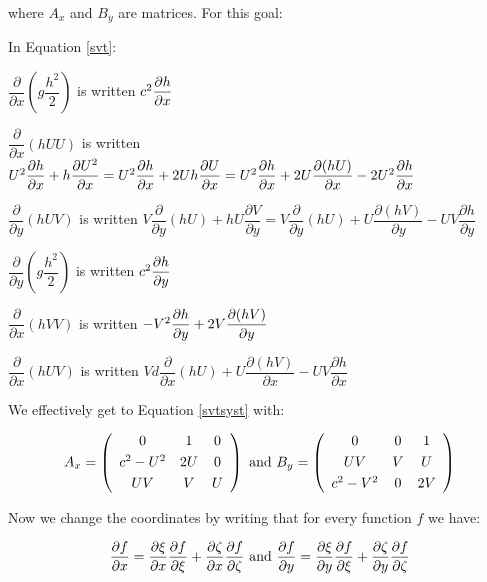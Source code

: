 where $A_{x}$ and $B_{y}$ are matrices. For this goal:

In Equation \ref{svt}:

$\dfrac{\partial }{\partial x}(g\dfrac{h^{2}}{2})$ is written $c^{2}\dfrac{%
\partial h}{\partial x}$

$\dfrac{\partial }{\partial x}(hUU)$ is written $U^{2}\dfrac{\partial h}{%
\partial x}+h\dfrac{\partial U^{2}}{\partial x}=U^{2}\dfrac{\partial h}{%
\partial x}+2Uh\dfrac{\partial U}{\partial x}=U^{2}\dfrac{\partial h}{\partial
x}+2U\dfrac{\partial (hU)}{\partial x}-2U^{2}\dfrac{\partial h}{\partial x}$

$\dfrac{\partial }{\partial y}(hUV)$ is written $V\dfrac{\partial }{\partial y}%
(hU)+hU\dfrac{\partial V}{\partial y}=V\dfrac{\partial }{\partial y}(hU)+U%
\dfrac{\partial (hV)}{\partial y}-UV\dfrac{\partial h}{\partial y}$

$\dfrac{\partial }{\partial y}(g\dfrac{h^{2}}{2})$ is written $c^{2}\dfrac{%
\partial h}{\partial y}$

$\dfrac{\partial }{\partial x}(hVV)$ is written $-V^{2}\dfrac{\partial h}{%
\partial y}+2V\dfrac{\partial (hV)}{\partial y}$

$\dfrac{\partial }{\partial x}(hUV)$ is written $Vd\dfrac{\partial }{\partial x}%
(hU)+U\dfrac{\partial (hV)}{\partial x}-UV\dfrac{\partial h}{\partial x}$

We effectively get to Equation \ref{svtsyst} with:

\begin{equation}
A_{x}=\left( 
\begin{array}{ccc}
0 & 1 & 0 \smallskip\\ 
c^{2}-U^{2} & 2U & 0 \smallskip\\ 
UV & V & U%
\end{array}
\right) \text{ and }B_{y}=\left( 
\begin{array}{ccc}
0 & 0 & 1 \smallskip\\ 
UV & V & U \smallskip\\ 
c^{2}-V^{2} & 0 & 2V%
\end{array}
\right)
\end{equation}

Now we change the coordinates by writing that for every function $f$ we have:

\begin{equation*}
\dfrac{\partial f}{\partial x}=\dfrac{\partial \xi }{\partial x}\dfrac{%
\partial f}{\partial \xi }+\dfrac{\partial \zeta }{\partial x}\dfrac{\partial
f}{\partial \zeta }\text{ and }\dfrac{\partial f}{\partial y}=\dfrac{\partial
\xi }{\partial y}\dfrac{\partial f}{\partial \xi }+\dfrac{\partial \zeta }{%
\partial y}\dfrac{\partial f}{\partial \zeta }
\end{equation*}

